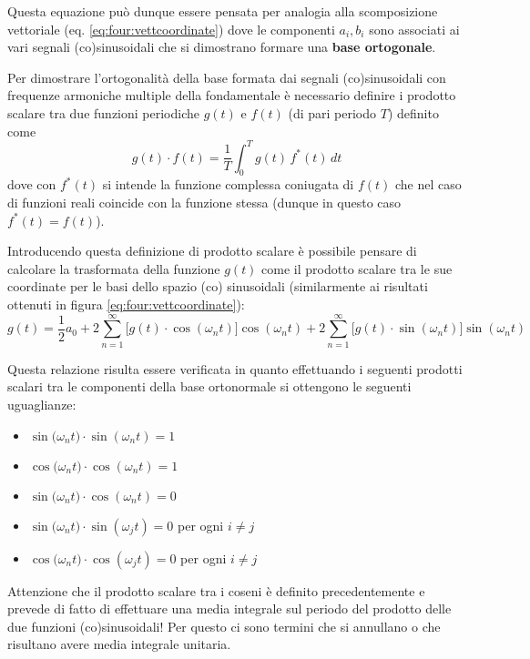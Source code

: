 	Questa equazione può dunque essere pensata per analogia alla scomposizione vettoriale (eq. \ref{eq:four:vettcoordinate}) dove le componenti $a_i,b_i$ sono associati ai vari segnali (co)sinusoidali che si dimostrano formare una \textbf{base ortogonale}.
	\begin{dimostrazione}
		Per dimostrare l'ortogonalità della base formata dai segnali (co)sinusoidali con frequenze armoniche multiple della fondamentale è necessario definire i prodotto scalare tra due funzioni periodiche $g(t)$ e $f(t)$ (di pari periodo $T$) definito come
		\[ g(t) \cdot f(t) = \frac 1 T \int_0 ^T g(t) \, f^*(t) \, dt  \]
		dove con $f^*(t)$ si intende la funzione complessa coniugata di $f(t)$ che nel caso di funzioni reali coincide con la funzione stessa (dunque in questo caso $f^*(t) = f(t)$). 
		
		Introducendo questa definizione di prodotto scalare è possibile pensare di calcolare la trasformata della funzione $g(t)$ come il prodotto scalare tra le sue coordinate per le basi dello spazio (co) sinusoidali (similarmente ai risultati ottenuti in figura \ref{eq:four:vettcoordinate}):
		\[ g(t) = \frac 1 2 a_0 + 2 \sum_{n=1}^\infty \Big[ g(t) \cdot \cos(\omega_nt) \Big]  \cos(\omega_nt) + 2 \sum_{n=1}^\infty \Big[g(t)\cdot \sin(\omega_nt)\Big]\sin(\omega_nt) \]
		
		Questa relazione risulta essere verificata in quanto effettuando i seguenti prodotti scalari tra le componenti della base ortonormale si ottengono le seguenti uguaglianze:
		\begin{itemize}
			\item $\sin\big(\omega_n t\big) \cdot \sin(\omega_n t) = 1$ 
			\item $\cos\big(\omega_n t\big) \cdot \cos(\omega_n t) = 1$ 
			\item $\sin\big(\omega_n t\big) \cdot \cos(\omega_n t) = 0$ 
			\item $\sin\big(\omega_n t\big) \cdot \sin(\omega_j t) = 0$ per ogni $i\neq j$
			\item $\cos\big(\omega_n t\big) \cdot \cos(\omega_j t) = 0$ per ogni $i\neq j$
		\end{itemize}
		Attenzione che il prodotto scalare tra i coseni è definito precedentemente e prevede di fatto di effettuare una media integrale sul periodo del prodotto delle due funzioni (co)sinusoidali! Per questo ci sono termini che si annullano o che risultano avere media integrale unitaria.
		
	\end{dimostrazione}


